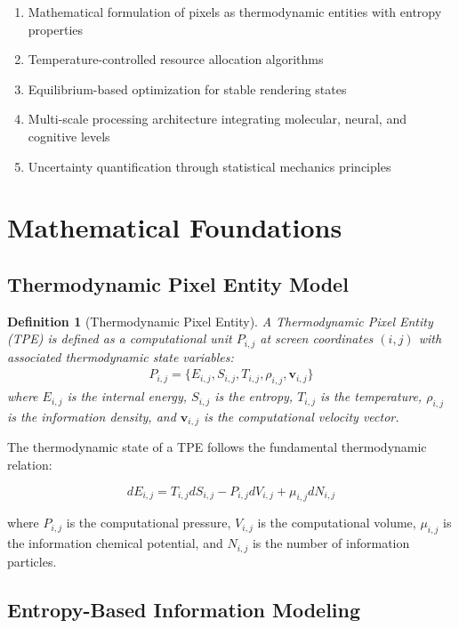\documentclass[12pt,a4paper]{article}
\newtheorem{definition}{Definition}
\begin{document}
\begin{enumerate}
\item Mathematical formulation of pixels as thermodynamic entities with entropy properties
\item Temperature-controlled resource allocation algorithms
\item Equilibrium-based optimization for stable rendering states
\item Multi-scale processing architecture integrating molecular, neural, and cognitive levels
\item Uncertainty quantification through statistical mechanics principles
\end{enumerate}

\section{Mathematical Foundations}

\subsection{Thermodynamic Pixel Entity Model}

\begin{definition}[Thermodynamic Pixel Entity]
A Thermodynamic Pixel Entity (TPE) is defined as a computational unit $P_{i,j}$ at screen coordinates $(i,j)$ with associated thermodynamic state variables:
\begin{align}
P_{i,j} = \{E_{i,j}, S_{i,j}, T_{i,j}, \rho_{i,j}, \mathbf{v}_{i,j}\}
\end{align}
where $E_{i,j}$ is the internal energy, $S_{i,j}$ is the entropy, $T_{i,j}$ is the temperature, $\rho_{i,j}$ is the information density, and $\mathbf{v}_{i,j}$ is the computational velocity vector.
\end{definition}

The thermodynamic state of a TPE follows the fundamental thermodynamic relation:

\begin{equation}
dE_{i,j} = T_{i,j}dS_{i,j} - P_{i,j}dV_{i,j} + \mu_{i,j}dN_{i,j}
\end{equation}

where $P_{i,j}$ is the computational pressure, $V_{i,j}$ is the computational volume, $\mu_{i,j}$ is the information chemical potential, and $N_{i,j}$ is the number of information particles.

\subsection{Entropy-Based Information Modeling}
\end{document}
